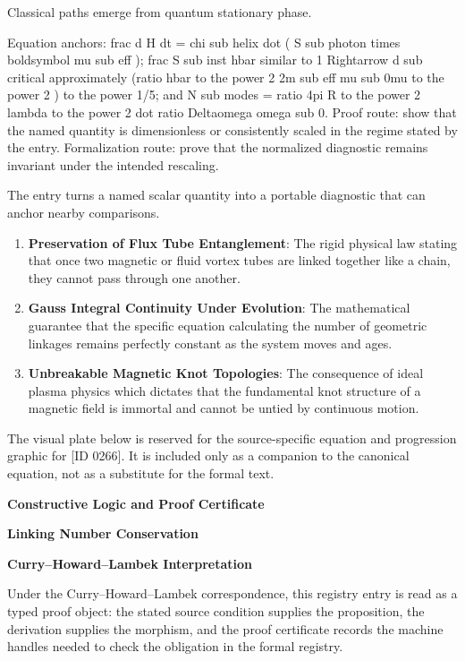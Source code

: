 Classical paths emerge from quantum stationary phase.

Equation anchors: frac d H dt = chi sub helix dot ( S sub photon times boldsymbol mu sub eff ); frac S sub inst hbar similar to 1 Rightarrow d sub critical approximately (ratio hbar to the power 2 2m sub eff mu sub 0mu to the power 2 ) to the power 1/5; and N sub modes = ratio 4pi R to the power 2 lambda to the power 2 dot ratio Deltaomega omega sub 0. Proof route: show that the named quantity is dimensionless or consistently scaled in the regime stated by the entry. Formalization route: prove that the normalized diagnostic remains invariant under the intended rescaling.

The entry turns a named scalar quantity into a portable diagnostic that can anchor nearby comparisons.
\endgroup

\begin{enumerate}[leftmargin=1.6em,itemsep=6pt,topsep=4pt]
\item \textbf{Preservation of Flux Tube Entanglement}: The rigid physical law stating that once two magnetic or fluid vortex tubes are linked together like a chain, they cannot pass through one another.
\item \textbf{Gauss Integral Continuity Under Evolution}: The mathematical guarantee that the specific equation calculating the number of geometric linkages remains perfectly constant as the system moves and ages.
\item \textbf{Unbreakable Magnetic Knot Topologies}: The consequence of ideal plasma physics which dictates that the fundamental knot structure of a magnetic field is immortal and cannot be untied by continuous motion.
\end{enumerate}

\begingroup\footnotesize\sloppy
The visual plate below is reserved for the source-specific equation and progression graphic for [ID 0266]. It is included only as a companion to the canonical equation, not as a substitute for the formal text.
\par\endgroup
\ifTZPDarkEdition
{}
\fi

\clearpage
\begingroup\tzpsupportsetup
\noindent\textbf{\fontsize{10.8pt}{12.8pt}\selectfont [ID 0266] Constructive Logic and Proof Certificate}\par
\noindent\textbf{\fontsize{10pt}{12pt}\selectfont Linking Number Conservation}\par
\vspace{0.45em}
\begingroup
\footnotesize
\setlength{\parskip}{0.22em}
\setlength{\parindent}{0pt}
\noindent\textbf{Curry--Howard--Lambek Interpretation}\par
Under the Curry--Howard--Lambek correspondence, this registry entry is read as a typed proof
object: the stated source condition supplies the proposition, the derivation supplies the
morphism, and the proof certificate records the machine handles needed to check the obligation
in the formal registry.

